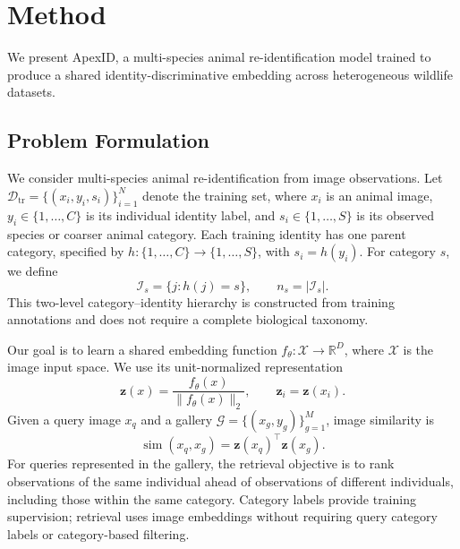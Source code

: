 \section{Method}
\label{sec:method}

We present ApexID, a multi-species animal re-identification model trained to
produce a shared identity-discriminative embedding across heterogeneous
wildlife datasets.

\subsection{Problem Formulation}
\label{sec:method:formulation}

We consider multi-species animal re-identification from image
observations. Let
$\mathcal{D}_{\mathrm{tr}}=\{(x_i,y_i,s_i)\}_{i=1}^{N}$
denote the training set, where $x_i$ is an animal image,
$y_i\in\{1,\ldots,C\}$ is its individual identity label, and
$s_i\in\{1,\ldots,S\}$ is its observed species or coarser animal
category. Each training identity has one parent category,
specified by
$h:\{1,\ldots,C\}\rightarrow\{1,\ldots,S\}$,
with $s_i=h(y_i)$. For category $s$, we define
\begin{equation}
\mathcal{I}_s=\{j:h(j)=s\},\qquad n_s=|\mathcal{I}_s|.
\label{eq:formulation:hierarchy}
\end{equation}
This two-level category--identity hierarchy is constructed
from training annotations and does not require a complete
biological taxonomy.

Our goal is to learn a shared embedding function
$f_\theta:\mathcal{X}\rightarrow\mathbb{R}^{D}$,
where $\mathcal{X}$ is the image input space.
We use its unit-normalized representation
\begin{equation}
\mathbf{z}(x)=\frac{f_\theta(x)}{\|f_\theta(x)\|_2},
\qquad \mathbf{z}_i=\mathbf{z}(x_i).
\label{eq:formulation:embedding}
\end{equation}
Given a query image $x_q$ and a gallery
$\mathcal{G}=\{(x_g,y_g)\}_{g=1}^{M}$, image similarity is
\begin{equation}
\operatorname{sim}(x_q,x_g)
=\mathbf{z}(x_q)^\top\mathbf{z}(x_g).
\label{eq:formulation:similarity}
\end{equation}
For queries represented in the gallery, the retrieval
objective is to rank observations of the same individual
ahead of observations of different individuals, including
those within the same category. Category labels provide
training supervision; retrieval uses image embeddings
without requiring query category labels or category-based
filtering.

